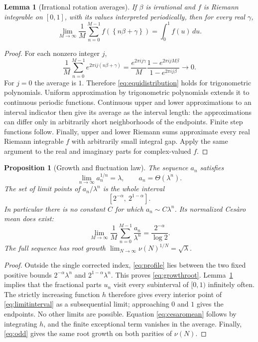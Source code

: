 \documentclass[11pt,letterpaper]{article}
\numberwithin{equation}{section}
\newtheorem{lemma}[theorem]{Lemma}
\newtheorem{proposition}[theorem]{Proposition}
\theoremstyle{definition}
\theoremstyle{remark}
\newcommand{\fracpart}[1]{\left\{#1\right\}}
\begin{document}
\begin{lemma}[Irrational rotation averages]\label{lem:rotation}
If $\beta$ is irrational and $f$ is Riemann integrable on $[0,1]$, with
its values interpreted periodically, then for every real $\gamma$,
\begin{equation}\label{eq:equidistribution}
 \lim_{M\to\infty}\frac1M\sum_{n=0}^{M-1}
 f(\fracpart{n\beta+\gamma})=\int_0^1f(u)\,du.
\end{equation}
\end{lemma}
\begin{proof}
For each nonzero integer $j$,
\[
 \frac1M\sum_{n=0}^{M-1}e^{2\pi i j(n\beta+\gamma)}
 =\frac{e^{2\pi i j\gamma}}{M}
   \frac{1-e^{2\pi i jM\beta}}{1-e^{2\pi i j\beta}}
 \longrightarrow0.
\]
For $j=0$ the average is $1$. Therefore \eqref{eq:equidistribution} holds
for trigonometric polynomials. Uniform approximation by trigonometric
polynomials extends it to continuous periodic functions.
Continuous upper and lower approximations to an interval indicator then
give its average as the interval length: the approximations can differ only
in arbitrarily short neighborhoods of the endpoints. Finite step functions
follow. Finally, upper and lower Riemann sums approximate every real Riemann
integrable $f$ with arbitrarily small integral gap. Apply the same argument
to the real and imaginary parts for complex-valued $f$.
\end{proof}

\begin{proposition}[Growth and fluctuation law]\label{prop:growth}
The sequence $a_n$ satisfies
\begin{equation}\label{eq:growthroot}
 \lim_{n\to\infty}a_n^{1/n}=\lambda,
 \qquad a_n=\Theta(\lambda^n).
\end{equation}
The set of limit points of $a_n/\lambda^n$ is the whole interval
\begin{equation}\label{eq:limitinterval}
 [2^{-\alpha},\ 2^{1-\alpha}].
\end{equation}
In particular there is no constant $C$ for which $a_n\sim C\lambda^n$.
Its normalized Ces\`aro mean does exist:
\begin{equation}\label{eq:cesaromean}
 \lim_{M\to\infty}\frac1M\sum_{n=0}^{M-1}\frac{a_n}{\lambda^n}
 =\frac{2^{-\alpha}}{\log 2}.
\end{equation}
The full sequence has root growth
$\lim_{N\to\infty}\nu(N)^{1/N}=\sqrt\lambda$.
\end{proposition}
\begin{proof}
Outside the single corrected index, \eqref{eq:profile} lies between the
two fixed positive bounds $2^{-\alpha}\lambda^n$ and
$2^{1-\alpha}\lambda^n$. This proves \eqref{eq:growthroot}.
Lemma~\ref{lem:rotation} implies that the fractional parts $u_n$ visit
every subinterval of $[0,1)$ infinitely often. The strictly increasing
function $h$ therefore gives every interior point of
\eqref{eq:limitinterval} as a subsequential limit; approaching $0$ and $1$
gives the endpoints. No other limits are possible. Equation
\eqref{eq:cesaromean} follows by integrating $h$, and the finite exceptional
term vanishes in the average. Finally, \eqref{eq:odd} gives the same
root growth on both parities of $\nu(N)$.
\end{proof}
\end{document}
